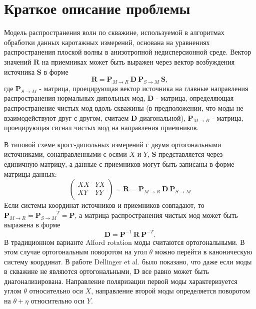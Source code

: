 \section{Краткое описание проблемы}

Модель распространения волн по скважине, используемой в алгоритмах обработки данных каротажных измерений, основана на уравнениях распространения плоской волны в анизотропной недисперсионной среде. Вектор значений $\mathbf{R}$ на приемниках может быть выражен через вектор возбуждения источника $\mathbf{S}$ в форме
$$
	\mathbf{R} = \mathbf{P}_{M \rightarrow R} \ \mathbf{D} \ \mathbf{P}_{S \rightarrow M} \ \mathbf{S},
$$
где $\mathbf{P}_{S \rightarrow M}$ - матрица, проецирующая вектор источника на главные направления распространения нормальных дипольных мод, $\mathbf{D}$ - матрица, определяющая распространение чистых мод вдоль скважины (в предположении, что моды не взаимодействуют друг с другом, считаем $\mathbf{D}$ диагональной), $\mathbf{P}_{M \rightarrow R}$ - матрица, проецирующая сигнал чистых мод на направления приемников.

В типовой схеме кросс-дипольных измерений с двумя ортогональными источниками, сонаправленными с осями $X$ и $Y$, $\mathbf{S}$ представляется через единичную матрицу, а данные с приемников могут быть записаны в форме матрицы данных:
$$
\left(
\begin{array}{cc}
XX & YX \\
XY & YY \\
\end{array}
\right) = \mathbf{R} = \mathbf{P}_{M \rightarrow R} \ \mathbf{D} \ \mathbf{P}_{S \rightarrow M}
$$
Если системы координат источников и приемников совпадают, то $\mathbf{P}_{M \rightarrow R}={\mathbf{P}_{S \rightarrow M}}^{T} = \mathbf{P}$, а матрица распространения чистых мод может быть выражена в форме
$$
	\mathbf{D} = \mathbf{P}^{-1} \ \mathbf{R} \ \mathbf{P}^{-T}.
$$
В традиционном варианте Alford rotation \cite{Alford1986} моды считаются ортогональными. В этом случае ортогональным поворотом на угол $\theta$ можно перейти в каноническую систему координат. В работе Dellinger et al. \cite{Dellinger1998} было показано, что даже если моды в скважине не являются ортогональными, $\mathbf{D}$ все равно может быть диагонализирована. Направление поляризации первой моды характеризуется углом $\theta$ относительно оси $X$, направление второй моды определяется поворотом на $\theta + \eta$ относительно оси $Y$.
\\


